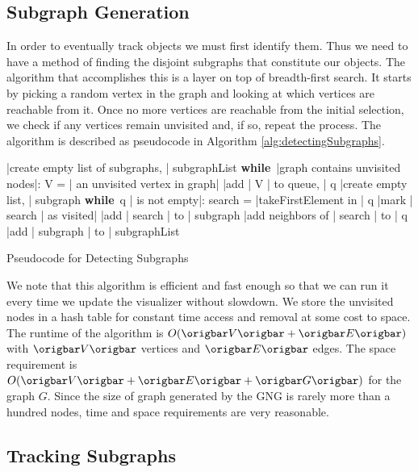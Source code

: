 \documentclass{article}
\renewcommand{\|}{\origbar} %
\renewcommand{\WHILE}{\mbox{{\bf while} }\tab}
\begin{document}
\subsection{Subgraph Generation}

In order to eventually track objects we must first identify them. Thus we need to have a method of finding the disjoint subgraphs that constitute our objects. The algorithm that accomplishes this is a layer on top of breadth-first search. It starts by picking a random vertex in the graph and looking at which vertices are reachable from it. Once no more vertices are reachable from the initial selection, we check if any vertices remain unvisited and, if so, repeat the process. The algorithm is described as pseudocode in Algorithm \ref{alg:detectingSubgraphs}.

\begin{Algorithm}[h!]
\begin{program}
  |create empty list of subgraphs, | subgraphList 
  \WHILE |graph contains unvisited nodes|:
    V = | an unvisited vertex in graph|
    |add | V | to queue, | q
    |create empty list, | subgraph 
    \WHILE q | is not empty|:
      search = |takeFirstElement in | q 
      |mark | search | as visited|
      |add | search | to | subgraph
      |add neighbors of | search | to | q \untab
  |add | subgraph | to | subgraphList
\end{program}
\caption{Pseudocode for Detecting Subgraphs}
\label{alg:detectingSubgraphs}
\end{Algorithm}

We note that this algorithm is efficient and fast enough so that we can run it every time we update the visualizer without slowdown. We store the unvisited nodes in a hash table for constant time access and removal at some cost to space. The runtime of the algorithm is $O(\|V\|+\|E\|)$ with $\|V\|$ vertices and $\|E\|$ edges. The space requirement is $O(\|V\|+\|E\|+\|G\|)$ for the graph $G$. Since the size of graph generated by the GNG is rarely more than a hundred nodes, time and space requirements are very reasonable.

\subsection{Tracking Subgraphs}
\end{document}

